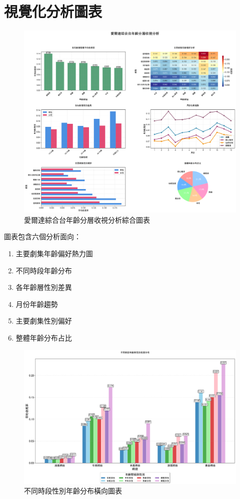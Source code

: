 \documentclass[11pt,a4paper]{article}
\begin{document}
\section{視覺化分析圖表}

\begin{figure}[H]
\centering
\includegraphics[width=\textwidth]{drama_age_analysis.png}
\caption{愛爾達綜合台年齡分層收視分析綜合圖表}
\label{fig:age_analysis}
\end{figure}

圖表包含六個分析面向：
\begin{enumerate}
    \item 主要劇集年齡偏好熱力圖
    \item 不同時段年齡分布
    \item 各年齡層性別差異
    \item 月份年齡趨勢
    \item 主要劇集性別偏好
    \item 整體年齡分布占比
\end{enumerate}

\begin{figure}[H]
\centering
\includegraphics[width=\textwidth]{gender_age_analysis_landscape.png}
\caption{不同時段性別年齡分布橫向圖表}
\label{fig:gender_landscape}
\end{figure}
\end{document}
